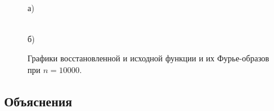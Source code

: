 \documentclass[a5paper, 10pt]{article}
\theoremstyle{definition}
\theoremstyle{plain}
\theoremstyle{remark}
\begin{document}
\begin{figure}[h!]
\begin{minipage}[h!]{0.5\linewidth}
 \\а)
\end{minipage}
\hfill
\begin{minipage}[h!]{0.5\linewidth}
 \\б)
\end{minipage}
\caption{ Графики восстановленной и исходной функции и их Фурье-образов при $n=10000$.}
\end{figure}

\subsection{Объяснения}
\end{document}
